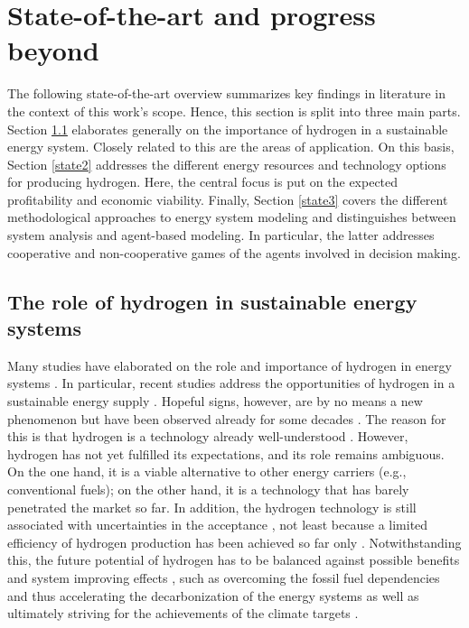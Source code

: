 \documentclass[review]{elsarticle}
\begin{document}
\section{State-of-the-art and progress beyond}\label{stateoftheart}
The following state-of-the-art overview summarizes key findings in literature in the context of this work's scope. Hence, this section is split into three main parts. Section \ref{state1} elaborates generally on the importance of hydrogen in a sustainable energy system. Closely related to this are the areas of application. On this basis, Section \ref{state2} addresses the different energy resources and technology options for producing hydrogen. Here, the central focus is put on the expected profitability and economic viability. Finally, Section \ref{state3} covers the different methodological approaches to energy system modeling and distinguishes between system analysis and agent-based modeling. In particular, the latter addresses cooperative and non-cooperative games of the agents involved in decision making. 

\subsection{The role of hydrogen in sustainable energy systems}\label{state1}
Many studies have elaborated on the role and importance of hydrogen in energy systems \cite{midilli2005hydrogen}. In particular, recent studies address the opportunities of hydrogen in a sustainable energy supply \cite{moller2017hydrogen}. Hopeful signs, however, are by no means a new phenomenon but have been observed already for some decades \cite{dunn2002hydrogen}. The reason for this is that hydrogen is a technology already well-understood \cite{momirlan2002current}. However, hydrogen has not yet fulfilled its expectations, and its role remains ambiguous. On the one hand, it is a viable alternative to other energy carriers \cite{johnston2005hydrogen} (e.g., conventional fuels); on the other hand, it is a technology that has barely penetrated the market so far. In addition, the hydrogen technology is still associated with uncertainties in the acceptance \cite{da2017hydrogen}, not least because a limited efficiency of hydrogen production has been achieved so far only \cite{page2009system}. Notwithstanding this, the future potential of hydrogen has to be balanced against possible benefits and system improving effects \cite{mcpherson2018role}, such as overcoming the fossil fuel dependencies and thus accelerating the decarbonization of the energy systems \cite{lux2020supply} as well as ultimately striving for the achievements of the climate targets \cite{chapman2020societal}.\vspace{0.3cm}
\end{document}
